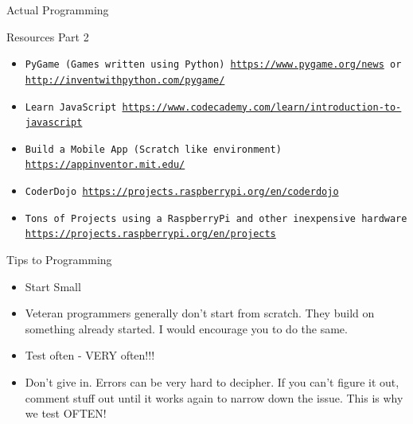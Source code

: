 \documentclass[10pt]{beamer}
\begin{document}
{\begin{frame}{Actual Programming}{}
\begin{block}{Resources Part 2}
  \begin{itemize}
    \item {\tt PyGame (Games written using Python) \url{https://www.pygame.org/news} or \url{http://inventwithpython.com/pygame/}}
    \item {\tt Learn JavaScript \url{https://www.codecademy.com/learn/introduction-to-javascript}}
    \item {\tt Build a Mobile App (Scratch like environment) \url{https://appinventor.mit.edu/}}
    \item  {\tt CoderDojo \url{https://projects.raspberrypi.org/en/coderdojo}}
    \item {\tt Tons of Projects using a RaspberryPi and other inexpensive hardware \url{https://projects.raspberrypi.org/en/projects}}
    \end{itemize}
  \end{block}
\end{frame}


\begin{frame}{Tips to Programming}{}
\begin{block}{}
  \begin{itemize}
    \item {Start Small}
    \item {Veteran programmers generally don't start from scratch.  They build on something already started.  I would encourage you to do the same.}
    \item {Test often - VERY often!!!}
    \item {Don't give in.  Errors can be very hard to decipher.  If you can't figure it out, comment stuff out until it works again to narrow down the issue.  This is why we test OFTEN!}
    \end{itemize}
  \end{block}
\end{frame}


}
\end{document}
